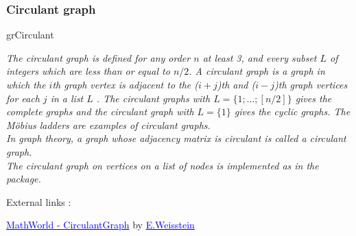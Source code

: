 \newpage 
\subsubsection{Circulant graph}
\begin{NewMacroBox}{grCirculant}{}

\medskip
\emph{The circulant graph  is defined for any order $n$ at least 3, and every subset $L$ of integers which are less than or equal to $n/2$.  A circulant graph is a graph  in which the $i$th graph vertex is adjacent to the ($i+j$)th and ($i-j$)th graph vertices for each $j$ in a list $L$ . The circulant graphs with $L=\{1;\dots;[n/2]\}$  gives the complete graphs  and the circulant graph with $L=\{1\}$  gives the cyclic graphs. The Möbius ladders are examples of circulant graphs.\\
 In graph theory, a graph  whose adjacency matrix is circulant is called a circulant graph.\\
The circulant graph on  vertices on a list of nodes  is implemented as  in the  package.}

\medskip
External links :

\href{http://mathworld.wolfram.com/CirculantGraph.html}%
           {\textcolor{blue}{MathWorld - CirculantGraph}} by %
      \href{http://en.wikipedia.org/wiki/Eric_W._Weisstein}%
           {\textcolor{blue}{E.Weisstein}}
\end{NewMacroBox}

\SetUpEdge[style = {thick,%
                    double          = orange,%
                    double distance = 1pt}]

\SetVertexNoLabel
{} 

\subsubsection{ }

